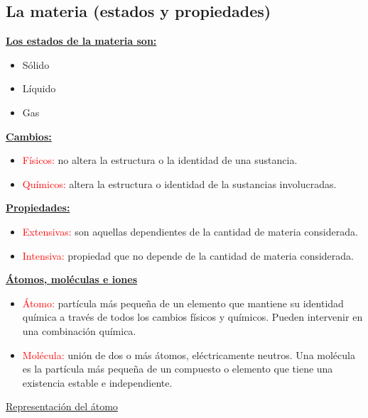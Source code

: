     \subsection{La materia (estados y propiedades)}
        \indent \textbf{\underline{Los estados de la materia son:}}
            \begin{itemize} 
                \item Sólido
                \item Líquido
                \item Gas
            \end{itemize}

        \indent \textbf{\underline{Cambios:}}
            \begin{itemize}
                \item \textcolor{red}{Físicos:} no altera la estructura o la identidad de una sustancia.
                \item \textcolor{red}{Químicos:} altera la estructura o identidad de la sustancias involucradas.
            \end{itemize}

        \indent \textbf{\underline{Propiedades:}}
            \begin{itemize}
                \item \textcolor{red}{Extensivas:} son aquellas dependientes de la cantidad de materia considerada.
                \item \textcolor{red}{Intensiva:} propiedad que no depende de la cantidad de materia considerada.
            \end{itemize}
            
        \indent \textbf{\underline{Átomos, moléculas e iones}}
            \begin{itemize}
                \item \textcolor{red}{Átomo:} partícula más pequeña de un elemento que mantiene su identidad química a través de todos los cambios físicos y químicos. Pueden intervenir en una combinación química. 
                \item \textcolor{red}{Molécula:} unión de dos o más átomos, eléctricamente neutros. Una molécula es la partícula más pequeña de un compuesto o elemento que tiene una existencia estable e independiente.
            \end{itemize}

            \begin{center} \underline{Representación del átomo} \end{center}
                \
        
